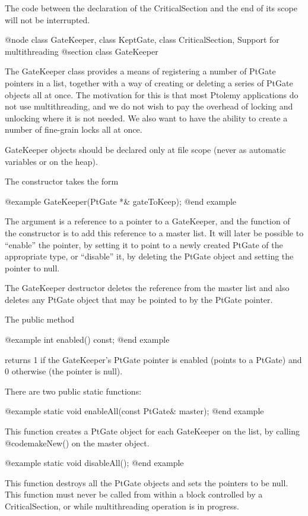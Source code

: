 The code between the declaration of the CriticalSection and the end
of its scope will not be interrupted.

@node class GateKeeper, class KeptGate, class CriticalSection, Support for multithreading
@section class GateKeeper

The GateKeeper class provides a means of registering a number of PtGate
pointers in a list, together with a way of creating or deleting a series
of PtGate objects all at once.  The motivation for this is that most
Ptolemy applications do not use multithreading, and we do not wish to
pay the overhead of locking and unlocking where it is not needed.  We
also want to have the ability to create a number of fine-grain locks
all at once.

GateKeeper objects should be declared only at file scope (never as
automatic variables or on the heap).

The constructor takes the form

@example
GateKeeper(PtGate *& gateToKeep);
@end example

The argument is a reference to a pointer to a GateKeeper, and the
function of the constructor is to add this reference to a master list.
It will later be possible to ``enable'' the pointer, by setting it to
point to a newly created PtGate of the appropriate type, or ``disable''
it, by deleting the PtGate object and setting the pointer to null.

The GateKeeper destructor deletes the reference from the master list and
also deletes any PtGate object that may be pointed to by the PtGate
pointer.

The public method

@example
int enabled() const;
@end example

returns 1 if the GateKeeper's PtGate pointer is enabled (points to a
PtGate) and 0 otherwise (the pointer is null).

There are two public static functions:

@example
static void enableAll(const PtGate& master);
@end example

This function creates a PtGate object for each GateKeeper on the list,
by calling @code{makeNew()} on the master object.

@example
static void disableAll();
@end example

This function destroys all the PtGate objects and sets the pointers to
be null.  This function must never be called from within a block
controlled by a CriticalSection, or while multithreading operation is
in progress.


